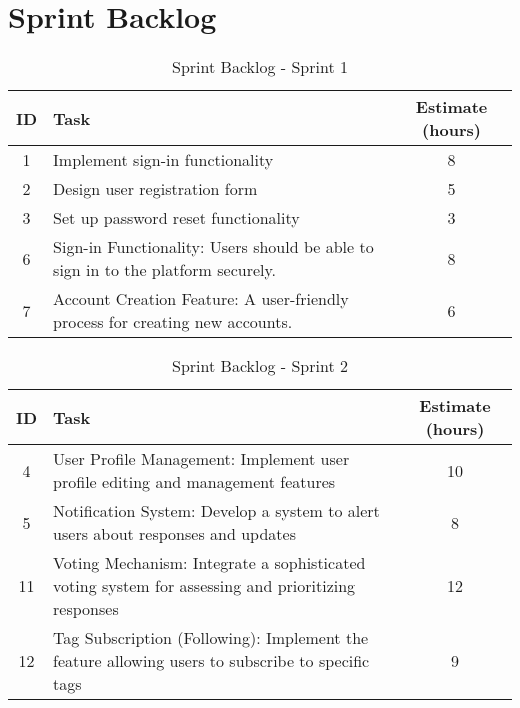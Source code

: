 \section{Sprint Backlog}\label{sprint_backlog}

\begin{table}[h]
    \centering
    \caption*{Sprint Backlog - Sprint 1}
    \begin{tabular}{|c|p{5cm}|c|}
        \hline
        \textbf{ID} & \textbf{Task} & \textbf{Estimate (hours)} \\
        \hline
        1 & Implement sign-in functionality & 8 \\
        \hline
        2 & Design user registration form & 5 \\
        \hline
        3 & Set up password reset functionality & 3 \\
        \hline
        6 & Sign-in Functionality: Users should be able to sign in to the platform securely. & 8 \\
        \hline
        7 & Account Creation Feature: A user-friendly process for creating new accounts. & 6 \\
        \hline
    \end{tabular}
\end{table}

\begin{table}[h]
    \centering
    \caption*{Sprint Backlog - Sprint 2}
    \begin{tabular}{|c|p{5cm}|c|}
        \hline
        \textbf{ID} & \textbf{Task} & \textbf{Estimate (hours)} \\
        \hline
        4 & User Profile Management: Implement user profile editing and management features & 10 \\
        \hline
        5 & Notification System: Develop a system to alert users about responses and updates & 8 \\
        \hline
        11 & Voting Mechanism: Integrate a sophisticated voting system for assessing and prioritizing responses & 12 \\
        \hline
        12 & Tag Subscription (Following): Implement the feature allowing users to subscribe to specific tags & 9 \\
        \hline
    \end{tabular}
\end{table}

